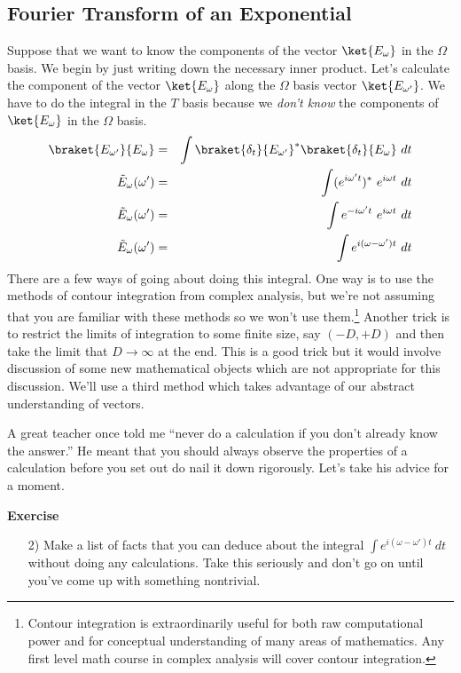 \subsection{Fourier Transform of an Exponential}
Suppose that we want to know the components of the vector $\ket{E_\omega}$ in the $\Omega$ basis.  We begin by just writing down the necessary inner product.  Let's calculate the component of the vector $\ket{E_\omega}$ along the $\Omega$ basis vector $\ket{E_{\omega '}}$.  We have to do the integral in the $T$ basis because we \emph{don't know} the components of $\ket{E_\omega}$ in the $\Omega$ basis.
\begin{eqnarray*}
\braket{E_{\omega '}}{E_\omega} &=& \int \braket{\delta_t}{E_{\omega '}}^* \braket{\delta_t}{E_\omega}~dt\\
\tilde{E}_{\omega}(\omega ') &=& \int (e^{i\omega ' t})^*~e^{i\omega t}~dt\\
\tilde{E}_{\omega}(\omega ') &=& \int e^{-i\omega ' t}~e^{i\omega t}~dt\\
\tilde{E}_\omega (\omega ') &=& \int e^{i(\omega - \omega ')t}~dt
\end{eqnarray*}
There are a few ways of going about doing this integral.  One way is to use the methods of contour integration from complex analysis, but we're not assuming that you are familiar with these methods so we won't use them.\footnote{Contour integration is extraordinarily useful for both raw computational power and for conceptual understanding of many areas of mathematics. Any first level math course in complex analysis will cover contour integration.}  Another trick is to restrict the limits of integration to some finite size, say $(-D,+D)$ and then take the limit that $D\rightarrow \infty$ at the end.  This is a good trick but it would involve discussion of some new mathematical objects which are not appropriate for this discussion.  We'll use a third method which takes advantage of our abstract understanding of vectors.

A great teacher once told me ``never do a calculation if you don't already know the answer.'' He meant that you should always observe the properties of a calculation before you set out do nail it down rigorously.  Let's take his advice for a moment.

\begin{flushleft}\textbf{Exercise}\end{flushleft}
\begin{itemize}
\item[2)] Make a list of facts that you can deduce about the integral $\int e^{i(\omega - \omega ')t}~dt$ without doing any calculations. Take this seriously and don't go on until you've come up with something nontrivial.
\end{itemize}

